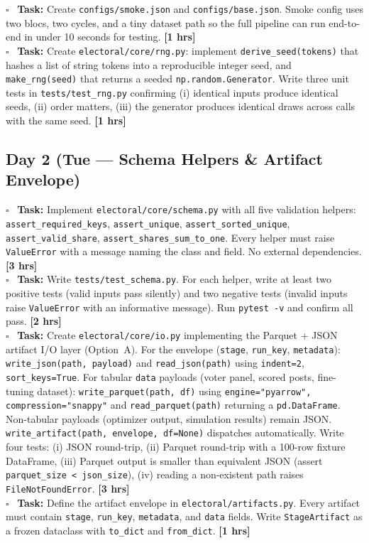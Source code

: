 \documentclass[11pt]{article}
\newcommand{\hrs}[1]{\textbf{[#1 hrs]}}
\newcommand{\dayhead}[2]{%
  \subsection*{Day #1 \normalfont\small\color{codegray}(#2)}}
\newcommand{\task}[2]{%
  \noindent\textbf{Task:} #1 \hfill \hrs{#2}\\}
\newcommand{\done}{\textcolor{sectionblue}{$\square$}\ }
\begin{document}
\begin{taskbox}
\done \task{Create \texttt{configs/smoke.json} and \texttt{configs/base.json}.
  Smoke config uses two blocs, two cycles, and a tiny dataset path so the
  full pipeline can run end-to-end in under 10 seconds for testing.}{1}

\done \task{Create \texttt{electoral/core/rng.py}: implement \texttt{derive\_seed(tokens)}
  that hashes a list of string tokens into a reproducible integer seed, and
  \texttt{make\_rng(seed)} that returns a seeded \texttt{np.random.Generator}.
  Write three unit tests in \texttt{tests/test\_rng.py} confirming
  (i) identical inputs produce identical seeds, (ii) order matters, (iii)
  the generator produces identical draws across calls with the same seed.}{1}
\end{taskbox}

\dayhead{2}{Tue --- Schema Helpers \& Artifact Envelope}

\begin{taskbox}
\done \task{Implement \texttt{electoral/core/schema.py} with all five validation
  helpers: \texttt{assert\_required\_keys}, \texttt{assert\_unique},
  \texttt{assert\_sorted\_unique}, \texttt{assert\_valid\_share},
  \texttt{assert\_shares\_sum\_to\_one}. Every helper must raise \texttt{ValueError}
  with a message naming the class and field. No external dependencies.}{3}

\done \task{Write \texttt{tests/test\_schema.py}. For each helper, write at least
  two positive tests (valid inputs pass silently) and two negative tests
  (invalid inputs raise \texttt{ValueError} with an informative message).
  Run \texttt{pytest -v} and confirm all pass.}{2}

\done \task{Create \texttt{electoral/core/io.py} implementing the Parquet + JSON
  artifact I/O layer (Option~A). For the envelope (\texttt{stage}, \texttt{run\_key},
  \texttt{metadata}): \texttt{write\_json(path, payload)} and \texttt{read\_json(path)}
  using \texttt{indent=2}, \texttt{sort\_keys=True}. For tabular \texttt{data}
  payloads (voter panel, scored posts, fine-tuning dataset): \texttt{write\_parquet(path,
  df)} using \texttt{engine="pyarrow", compression="snappy"} and
  \texttt{read\_parquet(path)} returning a \texttt{pd.DataFrame}. Non-tabular payloads
  (optimizer output, simulation results) remain JSON. \texttt{write\_artifact(path,
  envelope, df=None)} dispatches automatically. Write four tests: (i) JSON round-trip,
  (ii) Parquet round-trip with a 100-row fixture DataFrame, (iii) Parquet output is
  smaller than equivalent JSON (assert \texttt{parquet\_size < json\_size}), (iv)
  reading a non-existent path raises \texttt{FileNotFoundError}.}{3}

\done \task{Define the artifact envelope in \texttt{electoral/artifacts.py}.
  Every artifact must contain \texttt{stage}, \texttt{run\_key},
  \texttt{metadata}, and \texttt{data} fields. Write \texttt{StageArtifact}
  as a frozen dataclass with \texttt{to\_dict} and \texttt{from\_dict}.}{1}
\end{taskbox}
\end{document}
